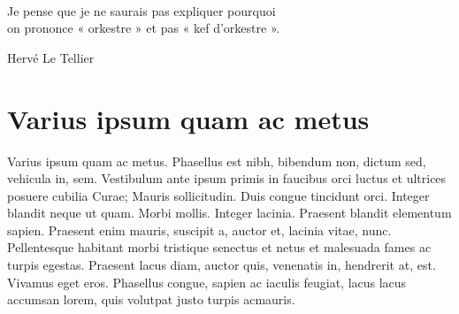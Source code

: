 \documentclass[../hdr.tex]{subfiles}
\begin{document}
\label{chap:autre-super}

\epigraph{\itshape 
  \begin{center}
    {}\\[1ex]
  \end{center}
  \hfill Je pense que je ne saurais pas expliquer pourquoi\\
  \hfill on prononce « orkestre » et pas « kef d'orkestre ».}{Hervé Le Tellier\footnotemark[1]}
\addtocounter{footnote}{1}

\ifSubfilesClassLoaded{%
  \setcounter{secnumdepth}{2}
  \setcounter{tocdepth}{2}
  \tableofcontents
  \begin{center}
  \par\noindent\rule{.4\textwidth}{0.4pt}
  \end{center}
}{%
  \minitoc
}
\vskip2cm


\section{Varius ipsum quam ac metus}

Varius ipsum quam ac metus. Phasellus est nibh, bibendum non, dictum sed,
vehicula in, sem. Vestibulum ante ipsum primis in faucibus orci luctus et
ultrices posuere cubilia Curae; Mauris sollicitudin. Duis congue tincidunt orci.
Integer blandit neque ut quam. Morbi mollis. Integer lacinia. Praesent blandit
elementum sapien. Praesent enim mauris, suscipit a, auctor et, lacinia vitae,
nunc. Pellentesque habitant morbi tristique senectus et netus et malesuada fames
ac turpis egestas. Praesent lacus diam, auctor quis, venenatis in, hendrerit at,
est. Vivamus eget eros. Phasellus congue, sapien ac iaculis feugiat, lacus lacus
accumsan lorem, quis volutpat justo turpis ac\footnotemark mauris.
\end{document}
